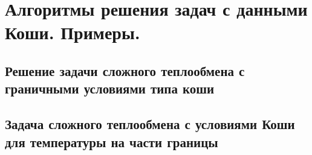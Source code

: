 \section{Алгоритмы решения задач с данными Коши. Примеры.}\label{sec:ch4/sec4}

\subsection{
    Решение задачи сложного теплообмена
с граничными условиями типа коши
}\label{subsec:ch4/sec4/subsec1}

\subsection{
    Задача сложного теплообмена с условиями
    Коши для температуры на части границы
}\label{subsec:ch4/sec4/subsec2}

